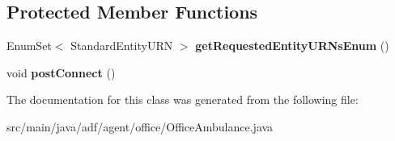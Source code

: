 \subsection*{Protected Member Functions}
\begin{DoxyCompactItemize}
\item 
\hypertarget{classadf_1_1agent_1_1office_1_1OfficeAmbulance_a1336aa3b61f97061b5bbc096667ac535}{}\label{classadf_1_1agent_1_1office_1_1OfficeAmbulance_a1336aa3b61f97061b5bbc096667ac535} 
Enum\+Set$<$ Standard\+Entity\+U\+RN $>$ {\bfseries get\+Requested\+Entity\+U\+R\+Ns\+Enum} ()
\item 
\hypertarget{classadf_1_1agent_1_1office_1_1OfficeAmbulance_a3202ac1379e3a96a4ed80b233d8556c3}{}\label{classadf_1_1agent_1_1office_1_1OfficeAmbulance_a3202ac1379e3a96a4ed80b233d8556c3} 
void {\bfseries post\+Connect} ()
\end{DoxyCompactItemize}


The documentation for this class was generated from the following file\+:\begin{DoxyCompactItemize}
\item 
src/main/java/adf/agent/office/Office\+Ambulance.\+java\end{DoxyCompactItemize}
